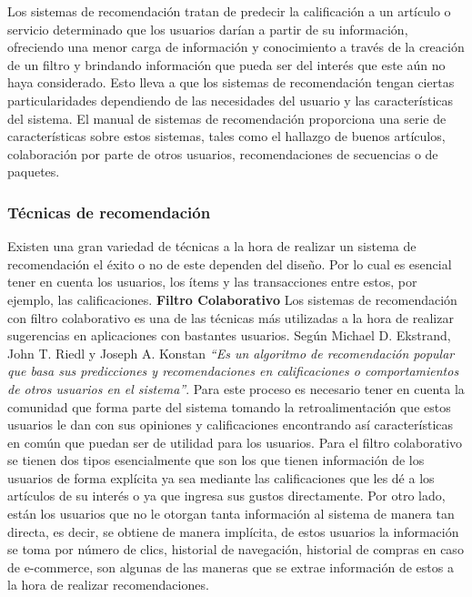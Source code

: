 \documentclass[12pt,letterpaper,openany]{book}
\begin{document}
Los sistemas de recomendación tratan de predecir la calificación a un artículo o servicio determinado que los usuarios darían a partir de su información, ofreciendo una menor carga de información y conocimiento a través de la creación de un filtro y brindando información que pueda ser del interés que este aún no haya considerado\cite{6}. Esto lleva a que los sistemas de recomendación tengan ciertas particularidades dependiendo de las necesidades del usuario y las características del sistema. El manual de sistemas de recomendación\cite{13} proporciona una serie de características sobre estos sistemas, tales como el hallazgo de buenos artículos, colaboración por parte de otros usuarios, recomendaciones de secuencias o de paquetes.

\subsubsection{Técnicas de recomendación}
Existen una gran variedad de técnicas a la hora de realizar un sistema de recomendación el éxito o no de este dependen del diseño. Por lo cual es esencial tener en cuenta los usuarios, los ítems y las transacciones entre estos, por ejemplo, las calificaciones\cite{13}.
\vspace{5mm}\newline
\textbf{Filtro Colaborativo}\newline
Los sistemas de recomendación con filtro colaborativo es una de las técnicas más utilizadas a la hora de realizar sugerencias en aplicaciones con bastantes usuarios. Según Michael D. Ekstrand, John T. Riedl y Joseph A. Konstan \textit{“Es un algoritmo de recomendación popular que basa sus predicciones y recomendaciones en calificaciones o comportamientos de otros usuarios en el sistema”}\cite{14}. Para este proceso es necesario tener en cuenta la comunidad que forma parte del sistema tomando la retroalimentación que estos usuarios le dan con sus opiniones y calificaciones encontrando así características en común que puedan ser de utilidad para los usuarios\cite{15}.
Para el filtro colaborativo se tienen dos tipos esencialmente que son los que tienen información de los usuarios de forma explícita ya sea mediante las calificaciones que les dé a los artículos de su interés o ya que ingresa sus gustos directamente. Por otro lado, están los usuarios que no le otorgan tanta información al sistema de manera tan directa, es decir, se obtiene de manera implícita, de estos usuarios la información se toma por número de clics, historial de navegación, historial de compras en caso de e-commerce, son algunas de las maneras que se extrae información de estos a la hora de realizar recomendaciones\cite{13}.
\end{document}
